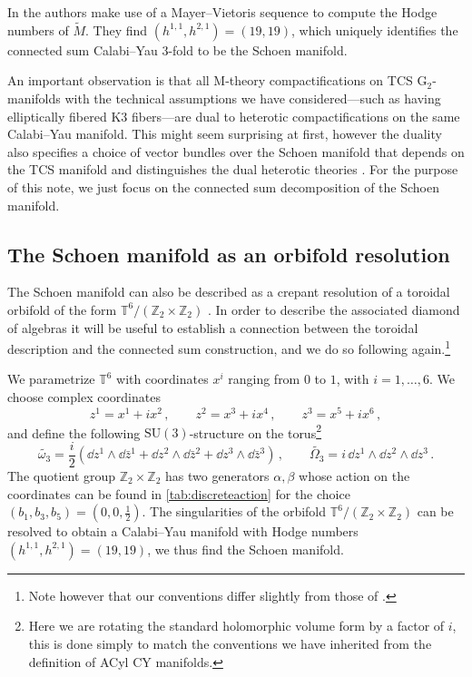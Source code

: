 \documentclass{pspum-l}
\theoremstyle{definition}
\theoremstyle{remark}
\numberwithin{equation}{section}
\begin{document}
In \cite{Braun:2017uku} the authors make use of a Mayer--Vietoris sequence to compute the Hodge numbers of $\widetilde{M}$. They find $\left( h^{1,1}, h^{2,1} \right)=(19,19)$, which uniquely identifies the connected sum Calabi--Yau 3-fold to be the Schoen manifold.

An important observation is that all M-theory compactifications on TCS G$_2$-manifolds with the technical assumptions we have considered---such as having elliptically fibered K3 fibers---are dual to heterotic compactifications on the same Calabi--Yau manifold. This might seem surprising at first, however the duality also specifies a choice of vector bundles over the Schoen manifold that depends on the TCS manifold and distinguishes the dual heterotic theories \cite{Braun:2017uku}. For the purpose of this note, we just focus on the connected sum decomposition of the Schoen manifold.




\subsection{The Schoen manifold as an orbifold resolution}

\label{sec:Schoenasorbifold}

The Schoen manifold can also be described as a crepant resolution of a toroidal orbifold of the form $\mathbb{T}^6/(\mathbb{Z}_2\times\mathbb{Z}_2)$ \cite{Joyce:1996b}. In order to describe the associated diamond of algebras it will be useful to establish a connection between the toroidal description and the connected sum construction, and we do so following \cite{Braun:2017uku} again.\footnote{Note however that our conventions differ slightly from those of \cite{Braun:2017uku}.}

We parametrize $\mathbb{T}^6$ with coordinates $x^i$ ranging from $0$ to $1$, with $i=1,\dots,6$. We choose complex coordinates
\begin{equation}
\label{eq:orbifoldcoords}
    z^1=x^1+i x^2 \, , \qquad z^2=x^3+i x^4 \, , \qquad z^3=x^5+i x^6 \, ,
\end{equation}
and define the following $\text{SU}(3)$-structure on the torus\footnote{Here we are rotating the standard holomorphic volume form by a factor of $i$, this is done simply to match the conventions we have inherited from the definition of ACyl CY manifolds.}
\begin{equation}
\label{eq:orbifoldSU3structure}
    \widetilde{\omega_3}=\frac{i}{2} \left( \dd z^1 \wedge \dd \bar{z}^1 + \dd z^2 \wedge \dd \bar{z}^2 + \dd z^3 \wedge \dd \bar{z}^3 \right) \, , \qquad \widetilde{\Omega_3}=i \, \dd z^1\wedge \dd z^2 \wedge \dd z^3 \, .
\end{equation}
The quotient group $\mathbb{Z}_2\times\mathbb{Z}_2$ has two generators {$\alpha, \beta$} whose action on the coordinates can be found in \cref{tab:discreteaction} for the choice $(b_1,b_3,b_5)=(0,0,\frac{1}{2})$. The singularities of the orbifold $\mathbb{T}^6/(\mathbb{Z}_2\times\mathbb{Z}_2)$ can be resolved to obtain a Calabi--Yau manifold with Hodge numbers $\left( h^{1,1}, h^{2,1} \right)=(19,19)$, we thus find the Schoen manifold.
\end{document}
